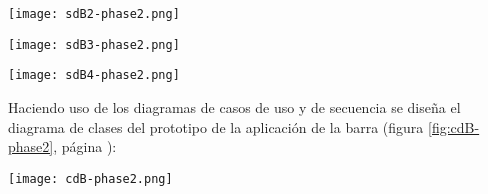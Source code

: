   \begin{sidewaysfigure}[hp]
    \begin{center}
      \texttt{[image: sdB2-phase2.png]}
      \caption{Diagrama de secuencia del caso de uso \emph{añadir un nuevo
      pedido (manual)}.}
      \label{fig:sdB2-phase2}
    \end{center}
  \end{sidewaysfigure}

  \begin{sidewaysfigure}[hp]
    \begin{center}
      \texttt{[image: sdB3-phase2.png]}
      \caption{Diagrama de secuencia del caso de uso \emph{actualizar
      estado de un pedido} de \emph{No atendido} a \emph{Servido}.}
      \label{fig:sdB3-phase2}
    \end{center}
  \end{sidewaysfigure}

  \begin{sidewaysfigure}[hp]
    \begin{center}
      \texttt{[image: sdB4-phase2.png]}
      \caption{Diagrama de secuencia del caso de uso \emph{generar factura}
      y \emph{cobrar importe total}.}
      \label{fig:sdB4-phase2}
    \end{center}
  \end{sidewaysfigure}

Haciendo uso de los diagramas de casos de uso y de secuencia se
diseña el diagrama de clases del prototipo de la aplicación de la barra
(figura \ref{fig:cdB-phase2}, página \pageref{fig:cdB-phase2}):

  \begin{sidewaysfigure}[hp]
    \begin{center}
      \texttt{[image: cdB-phase2.png]}
      \caption{Diagrama de clases del prototipo de la aplicación de la barra
      (Fase 3).}
      \label{fig:cdB-phase2}
    \end{center}
  \end{sidewaysfigure}

